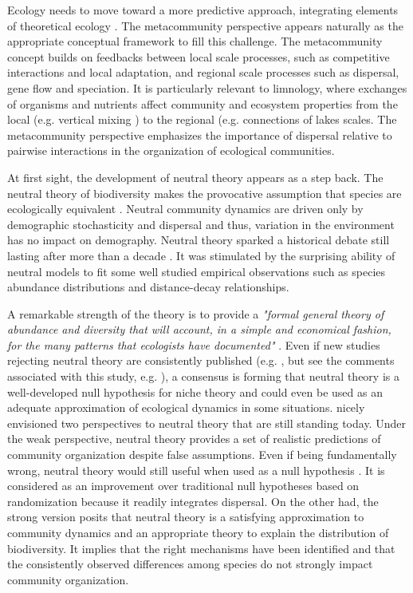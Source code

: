 \documentclass[12pt]{article}
\begin{document}
Ecology needs to move toward a more predictive approach, integrating elements of
theoretical ecology \parencite{Thuiller2013}. The metacommunity perspective
\parencite{Leibold2004a} appears naturally as the appropriate conceptual
framework to fill this challenge. The metacommunity concept builds on feedbacks
between local scale processes, such as competitive interactions and local
adaptation, and regional scale processes such as dispersal, gene flow and
speciation. It is particularly relevant to limnology, where exchanges of
organisms and nutrients affect community and ecosystem properties from the local
(e.g. vertical mixing \parencite{Ryabov2011}) to the regional (e.g. connections
of lakes \parencite{Leibold2004b, Muneepeerakul2008, Gravel2010a} scales. The
metacommunity perspective emphasizes the importance of dispersal relative to
pairwise interactions in the organization of ecological communities.

At first sight, the development of neutral theory appears as a step back.
The neutral theory of biodiversity makes the provocative assumption that species are
ecologically equivalent \parencite{Bell2000,Hubbell2001}. Neutral community
dynamics are driven only by demographic stochasticity and dispersal and thus,
variation in the environment has no impact on demography. Neutral theory sparked
a historical debate still lasting after more than a decade
\parencite{Chave2004, Etienne2011, Rosindell2012,Clark2012}. It was stimulated
by the surprising ability of neutral models to fit some well studied empirical
observations such as species abundance distributions and distance-decay
relationships.

A remarkable strength of the theory is to provide a \emph{"formal general theory
of abundance and diversity that will account, in a simple and economical
fashion, for the many patterns that ecologists have documented"}
\parencite{Bell2001}. Even if new studies rejecting neutral theory are
consistently published (e.g. \textcite{Ricklefs2012}, but see the comments
associated with this study, e.g. \textcite{Etienne2012b}), a consensus is
forming that neutral theory is a well-developed null hypothesis for niche theory
and could even be used as an adequate approximation of ecological dynamics in
some situations. \textcite{Bell2001} nicely envisioned two perspectives to
neutral theory that are still standing today. Under the weak perspective,
neutral theory provides a set of realistic predictions of community organization
despite false assumptions. Even if being fundamentally wrong, neutral theory
would still useful when used as a null hypothesis \parencite{Gotelli2006}. It is
considered as an improvement over traditional null hypotheses based on
randomization \parencite{Gotelli2000} because it readily integrates dispersal.
On the other had, the strong version posits that neutral theory is a satisfying
approximation to community dynamics and an appropriate theory to explain the
distribution of biodiversity. It implies that the right mechanisms have been
identified and that the consistently observed differences among species do not
strongly impact community organization.
\end{document}
